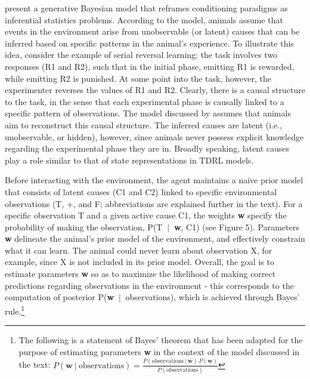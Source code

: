 \documentclass[11pt]{article}
\newcommand\given[1][]{\:#1\vert\:} %
\let\citeN=\citet
\begin{document}
\citeN{Courville2006} present a generative Bayesian model that reframes 
conditioning paradigms as inferential statistics problems. According to the 
model, animals assume that events in the environment arise from unobservable 
(or latent) causes that can be inferred based on specific patterns in the 
animal's experience. To illustrate this idea, consider the example of serial 
reversal learning; the task involves two responses (R1 and R2), such that in 
the initial phase, emitting R1 is rewarded, while emitting R2 is punished. At 
some point into the task, however, the experimenter reverses the values of R1 
and R2. Clearly, there is a causal structure to the task, in the sense that 
each experimental phase is causally linked to a specific pattern of 
observations. The model discussed by \citeN{Courville2006} assumes that animals 
aim to reconstruct this causal structure. The inferred causes are latent (i.e., 
unobservable, or hidden), however, since animals never possess explicit 
knowledge regarding the experimental phase they are in. Broadly speaking, 
latent causes play a role similar to that of state representations in TDRL 
models.

Before interacting with the environment, the agent maintains a naive prior 
model that consists of latent causes (C1 and C2) linked to specific 
environmental observations (T, $+$, and F; abbreviations are explained further 
in the text). For a specific observation T and a given active cause C1, the 
weights \textbf{w} specify the probability of making the observation, P(T $
\given$ \textbf{w}, C1) (see Figure 5). Parameters \textbf{w} delineate the 
animal's prior model of the environment, and effectively constrain what it can 
learn. The animal could never learn about observation X, for example, since X 
is not included in its prior model. Overall, the goal is to estimate parameters 
\textbf{w} so as to maximize the likelihood of making correct predictions 
regarding observations in the environment - this corresponds to the computation 
of posterior P(\textbf{w} $\given$ observations), which is achieved through 
Bayes' rule.\footnote{The following is a statement of Bayes' theorem that has 
been adapted for the purpose of estimating parameters \textbf{w} in the context 
of the model discussed in the text: $P(\textbf{w} \given \text{observations}) = 
\frac{P(\text{observations} \given \textbf{w}) \, P(\textbf{w})}
{P(\text{observations})}$}
\end{document}
